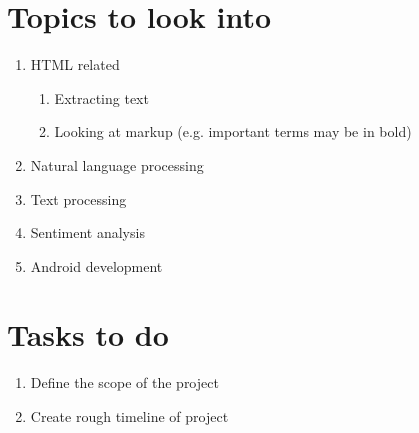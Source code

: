 \documentclass[11pt,a4paper]{article}
\begin{document}
\section{Topics to look into}
\begin{enumerate}
\item HTML related
 \begin{enumerate}
 \item Extracting text
 \item Looking at markup (e.g. important terms may be in bold)
 \end{enumerate}
\item Natural language processing
\item Text processing
\item Sentiment analysis
\item Android development
\end{enumerate}

\section{Tasks to do}
\begin{enumerate}
\item Define the scope of the project
\item Create rough timeline of project
\end{enumerate}
\end{document}
